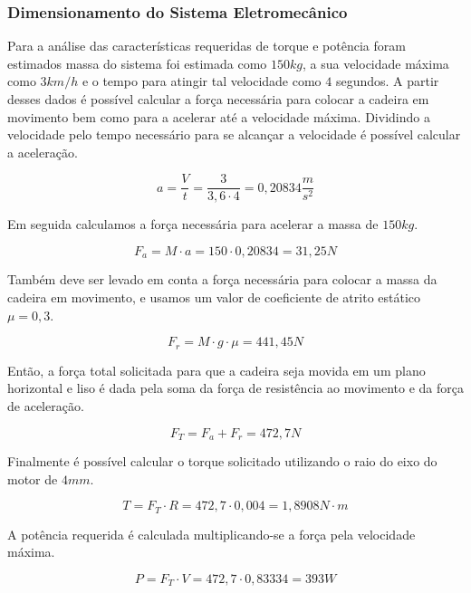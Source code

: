 \subsubsection{Dimensionamento do Sistema Eletromecânico}

Para a análise das características requeridas de torque e potência foram estimados
massa do 
sistema foi estimada como $150 kg$, a sua velocidade máxima 
como $3 km/h$
e o tempo para atingir tal velocidade como $4$ segundos. 
A partir desses dados é
possível 
calcular a força necessária para colocar a cadeira em movimento 
bem como
para a acelerar até a velocidade máxima. Dividindo a velocidade pelo tempo necessário
para se alcançar a velocidade é possível calcular a aceleração.

\begin{equation}
a = \frac{V}{t} = \frac{3}{3,6\cdot 4} = 0,20834  \frac{m}{s^2}
\end{equation}

Em seguida calculamos a força necessária para acelerar a massa de $150 kg$.

\begin{equation}
F_{a} = M \cdot a = 150 \cdot 0,20834 = 31,25 N
\end{equation}

Também deve ser levado em conta a força necessária para colocar 
a massa da cadeira
em movimento, 
e usamos um valor de coeficiente de atrito estático $\mu = 0,3$.

\begin{equation}
F_{r} = M \cdot g \cdot \mu = 441,45 N
\end{equation}

Então, a força total solicitada para que a cadeira seja movida 
em um plano 
horizontal e liso é dada pela soma da força de resistência ao 
movimento e da força de aceleração.

\begin{equation}
F_{T} = F_{a} + F_{r} = 472,7 N
\end{equation}

Finalmente é possível calcular o torque solicitado utilizando o raio do eixo do
motor de $4mm$.

\begin{equation}
T = F_{T} \cdot R = 472,7 \cdot 0,004 = 1,8908 N\cdot m
\end{equation}

A potência requerida é calculada multiplicando-se a força pela velocidade máxima.

\begin{equation}
P = F_{T} \cdot V = 472,7 \cdot 0,83334 = 393 W
\end{equation}

